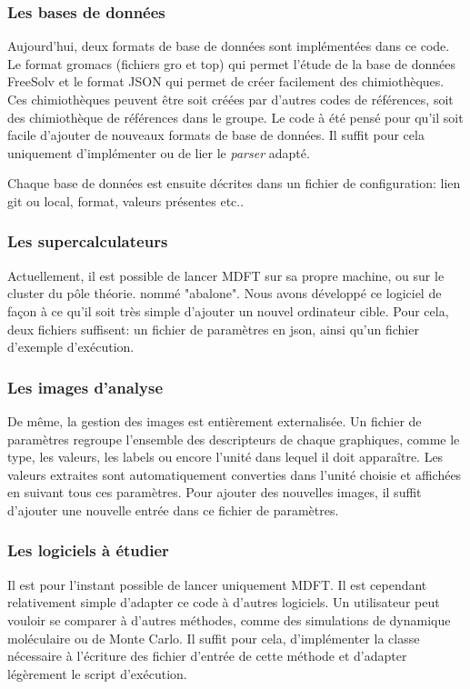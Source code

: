 \subsubsection{Les bases de données}
Aujourd'hui, deux formats de base de données sont implémentées dans ce code. Le format gromacs (fichiers gro et top) qui permet l'étude de la base de données FreeSolv et le format JSON qui permet de créer facilement des chimiothèques. Ces chimiothèques peuvent être soit créées par d'autres codes de références, soit des chimiothèque de références dans le groupe. Le code à été pensé pour qu'il soit facile d'ajouter de nouveaux formats de base de données. Il suffit pour cela uniquement d'implémenter ou de lier le \textit{parser} adapté.

Chaque base de données est ensuite décrites dans un fichier de configuration: lien git ou local, format, valeurs présentes etc..

\subsubsection{Les supercalculateurs}
Actuellement, il est possible de lancer MDFT sur sa propre machine, ou sur le cluster du pôle théorie. nommé "abalone". Nous avons développé ce logiciel de façon à ce qu'il soit très simple d'ajouter un nouvel ordinateur cible. Pour cela, deux fichiers suffisent: un fichier de paramètres en json, ainsi qu'un fichier d'exemple d’exécution.

\subsubsection{Les images d'analyse}
De même, la gestion des images est entièrement externalisée. Un fichier de paramètres regroupe l'ensemble des descripteurs de chaque graphiques, comme le type, les valeurs, les labels ou encore l'unité dans lequel il doit apparaître. Les valeurs extraites sont automatiquement converties dans l'unité choisie et affichées en suivant tous ces paramètres. Pour ajouter des nouvelles images, il suffit d'ajouter une nouvelle entrée dans ce fichier de paramètres.

\subsubsection{Les logiciels à étudier}
Il est pour l'instant possible de lancer uniquement MDFT. Il est cependant relativement simple d'adapter ce code à d'autres logiciels. Un utilisateur peut vouloir se comparer à d'autres méthodes, comme des simulations de dynamique moléculaire ou de Monte Carlo. Il suffit pour cela, d'implémenter la classe nécessaire à l'écriture des fichier d'entrée de cette méthode et d'adapter légèrement le script d’exécution.





